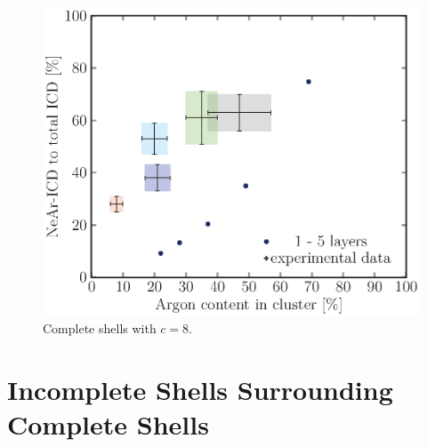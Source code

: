 \begin{figure}[!h]
\begin{minipage}{0.48\textwidth}
    \centering
    \includegraphics[scale=0.5]{pics/compl08.ps}
    \caption{Complete shells with $c=8$.}
    \label{compl08}
\end{minipage}
\hfill
\begin{minipage}{0.48\textwidth}
    \centering
\end{minipage}
\end{figure}

\newpage




\section{Incomplete Shells Surrounding Complete Shells}
